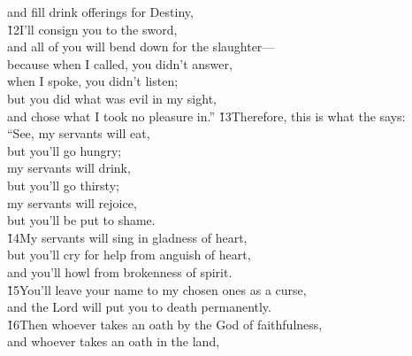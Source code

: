 \begin{poetry}
\poemll    and fill drink offerings for Destiny, \\
\poeml \v{12}I'll consign you to the sword, \\
\poemll    and all of you will bend down for the slaughter--- \\
\poeml because when I called, you didn't answer, \\
\poemll    when I spoke, you didn't listen; \\
\poeml but you did what was evil in my sight, \\
\poemll    and chose what I took no pleasure in.''
\poeml \v{13}Therefore, this is what the  says: \\
\poeml ``See, my servants will eat, \\
\poemll    but you'll go hungry; \\
\poeml my servants will drink, \\
\poemll    but you'll go thirsty; \\
\poeml my servants will rejoice, \\
\poemll    but you'll be put to shame. \\
\poeml \v{14}My servants will sing in gladness of heart, \\
\poemll    but you'll cry for help from anguish of heart, \\
\poemlll       and you'll howl from brokenness of spirit. \\
\poeml \v{15}You'll leave your name to my chosen ones as a curse, \\
\poemll    and the Lord  will put you to death permanently. \\
\poeml \v{16}Then whoever takes an oath by the God of faithfulness, \\
\poemll    and whoever takes an oath in the land, \\

\end{poetry}
